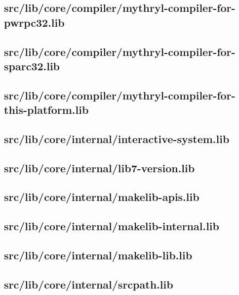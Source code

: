 \subsection{src/lib/core/compiler/mythryl-compiler-for-pwrpc32.lib}


\subsection{src/lib/core/compiler/mythryl-compiler-for-sparc32.lib}


\subsection{src/lib/core/compiler/mythryl-compiler-for-this-platform.lib}


\subsection{src/lib/core/internal/interactive-system.lib}


\subsection{src/lib/core/internal/lib7-version.lib}


\subsection{src/lib/core/internal/makelib-apis.lib}


\subsection{src/lib/core/internal/makelib-internal.lib}


\subsection{src/lib/core/internal/makelib-lib.lib}


\subsection{src/lib/core/internal/srcpath.lib}


